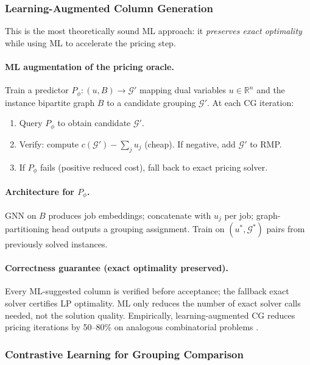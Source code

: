 \documentclass[11pt,a4paper]{article}
\theoremstyle{plain}
\theoremstyle{definition}
\newcommand{\calG}{\mathcal{G}}     %
\begin{document}
\subsubsection{Learning-Augmented Column Generation}
\label{sec:LACG}

This is the most theoretically sound ML approach: it \emph{preserves exact optimality}
while using ML to accelerate the pricing step.

\paragraph{ML augmentation of the pricing oracle.}
Train a predictor $P_\phi: (u, B) \to \calG'$ mapping dual variables
$u \in \mathbb{R}^n$ and the instance bipartite graph $B$ to a candidate grouping $\calG'$.
At each CG iteration:
\begin{enumerate}[label=(\alph*)]
  \item Query $P_\phi$ to obtain candidate $\calG'$.
  \item Verify: compute $c(\calG') - \sum_j u_j$ (cheap). If negative, add $\calG'$ to RMP.
  \item If $P_\phi$ fails (positive reduced cost), fall back to exact pricing solver.
\end{enumerate}

\paragraph{Architecture for $P_\phi$.}
GNN on $B$ produces job embeddings; concatenate with $u_j$ per job;
graph-partitioning head outputs a grouping assignment.
Train on $(u^*, \calG^*)$ pairs from previously solved instances.

\paragraph{Correctness guarantee (exact optimality preserved).}
Every ML-suggested column is verified before acceptance; the fallback exact solver
certifies LP optimality. ML only reduces the number of exact solver calls needed,
not the solution quality. Empirically, learning-augmented CG reduces pricing
iterations by 50--80\% on analogous combinatorial problems \cite{Khalil2016,Gasse2019}.

\subsubsection{Contrastive Learning for Grouping Comparison}
\label{sec:contrastive}
\end{document}
